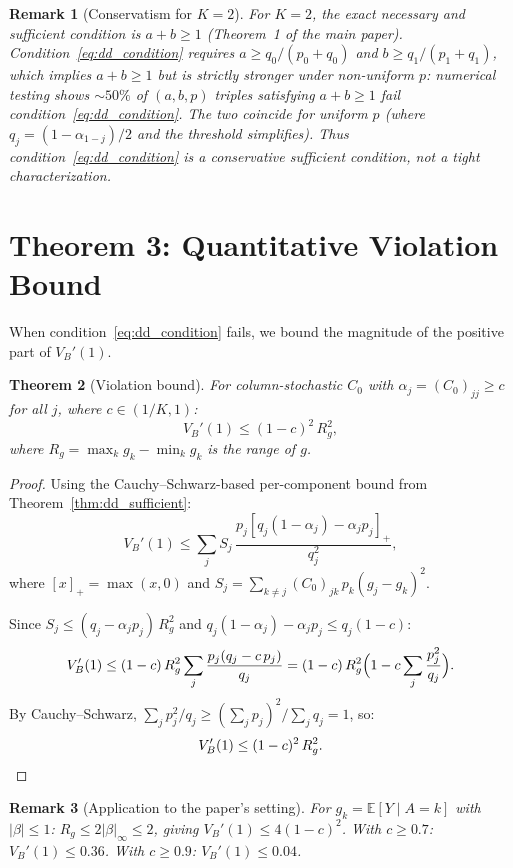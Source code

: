 \documentclass[11pt]{article}
\newtheorem{theorem}{Theorem}
\newtheorem{remark}[theorem]{Remark}
\begin{document}
\begin{remark}[Conservatism for $K=2$]
For $K=2$, the exact necessary and sufficient condition is $a + b \geq 1$
(Theorem~1 of the main paper).
Condition~\eqref{eq:dd_condition} requires $a \geq q_0/(p_0+q_0)$
and $b \geq q_1/(p_1+q_1)$, which \emph{implies} $a+b \geq 1$ but is
strictly stronger under non-uniform $p$: numerical testing shows
${\sim}50\%$ of $(a,b,p)$ triples satisfying $a+b \geq 1$ fail
condition~\eqref{eq:dd_condition}.
The two coincide for uniform $p$ (where $q_j = (1-\alpha_{1-j})/2$
and the threshold simplifies).
Thus condition~\eqref{eq:dd_condition} is a conservative sufficient
condition, not a tight characterization.
\end{remark}

\section{Theorem 3: Quantitative Violation Bound}

When condition~\eqref{eq:dd_condition} fails, we bound the magnitude of the positive part of $V_B'(1)$.

\begin{theorem}[Violation bound]
\label{thm:eps_bound}
For column-stochastic $C_0$ with $\alpha_j = (C_0)_{jj} \geq c$ for all $j$, where $c \in (1/K, 1)$:
\begin{equation}
  V_B'(1) \leq (1-c)^2\,R_g^2,
  \label{eq:violation_bound}
\end{equation}
where $R_g = \max_k g_k - \min_k g_k$ is the range of $g$.
\end{theorem}

\begin{proof}
Using the Cauchy--Schwarz-based per-component bound from Theorem~\ref{thm:dd_sufficient}:
\[
  V_B'(1) \leq \sum_j S_j\,\frac{p_j[q_j(1-\alpha_j) - \alpha_j p_j]_+}{q_j^2},
\]
where $[x]_+ = \max(x,0)$ and $S_j = \sum_{k\neq j}(C_0)_{jk}\,p_k(g_j-g_k)^2$.

Since $S_j \leq (q_j - \alpha_j p_j)\,R_g^2$ and $q_j(1-\alpha_j) - \alpha_j p_j \leq q_j(1-c)$:
\[
  V_B'(1) \leq (1-c)\,R_g^2\sum_j \frac{p_j(q_j - c\,p_j)}{q_j}
  = (1-c)\,R_g^2\Bigl(1 - c\sum_j \frac{p_j^2}{q_j}\Bigr).
\]
By Cauchy--Schwarz, $\sum_j p_j^2/q_j \geq (\sum_j p_j)^2/\sum_j q_j = 1$, so:
\[
  V_B'(1) \leq (1-c)^2\,R_g^2. \qedhere
\]
\end{proof}

\begin{remark}[Application to the paper's setting]
For $g_k = \mathbb{E}[Y \mid A{=}k]$ with $|\beta| \leq 1$:
$R_g \leq 2|\beta|_\infty \leq 2$, giving $V_B'(1) \leq 4(1-c)^2$.
With $c \geq 0.7$: $V_B'(1) \leq 0.36$.
With $c \geq 0.9$: $V_B'(1) \leq 0.04$.
\end{remark}
\end{document}
